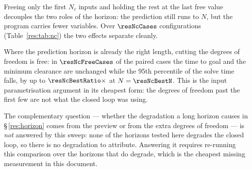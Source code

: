 

\label{res:nc}


Freeing only the first $N_c$ inputs and holding the rest at the last free value decouples the two roles of the horizon: the prediction still runs to $N$, but the program carries fewer variables. Over $\resNcCases$ configurations (Table~\ref{res:tab:nc}) the two effects separate cleanly.

Where the prediction horizon is already the right length, cutting the degrees of freedom is free: in $\resNcFreeCases$ of the paired cases the time to goal and the minimum clearance are unchanged while the 95th percentile of the solve time falls, by up to $\resNcBestRatio\times$ at $N=\resNcBestN$. This is the input parametrisation argument in its cheapest form: the degrees of freedom past the first few are not what the closed loop was using.

The complementary question --- whether the degradation a long horizon causes in \S\,\ref{res:horizon} comes from the preview or from the extra degrees of freedom --- is \emph{not} answered by this sweep: none of the horizons tested here degrades the closed loop, so there is no degradation to attribute. Answering it requires re-running this comparison over the horizons that do degrade, which is the cheapest missing measurement in this document.


